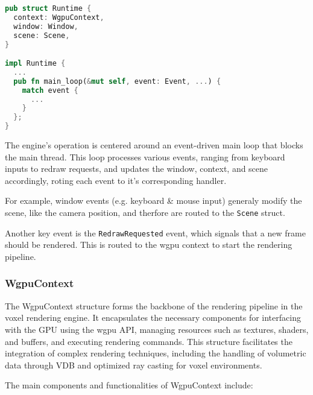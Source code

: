 \begin{lstlisting}[language=rust,caption={Runtime definition},captionpos=b]
pub struct Runtime {
  context: WgpuContext,
  window: Window,
  scene: Scene,
}

impl Runtime {
  ...
  pub fn main_loop(&mut self, event: Event, ...) {
    match event {
      ...
    }
  };
}
\end{lstlisting}

The engine's operation is centered around an event-driven main loop that blocks the main thread.
This loop processes various events, ranging from keyboard inputs to redraw requests, and updates the window, context, and scene accordingly, roting each event to it's corresponding handler.

For example, window events (e.g. keyboard \& mouse input) generaly modify the scene, like the camera position, and therfore are routed to the \verb|Scene| struct.

Another key event is the \verb|RedrawRequested| event, which signals that a new frame should be rendered. This is routed to the wgpu context to start the rendering pipeline.

\subsubsection{WgpuContext}
The WgpuContext structure forms the backbone of the rendering pipeline in the voxel rendering engine. It encapsulates the necessary components for interfacing with the GPU using the wgpu API, managing resources such as textures, shaders, and buffers, and executing rendering commands. This structure facilitates the integration of complex rendering techniques, including the handling of volumetric data through VDB and optimized ray casting for voxel environments.

The main components and functionalities of WgpuContext include:

